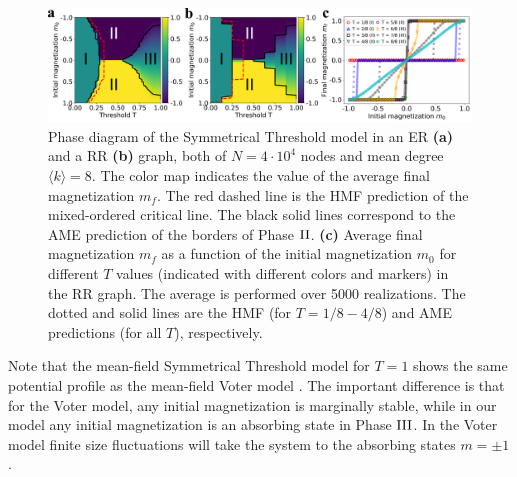 \begin{figure}
	\centering \captionsetup{font=sf}
	\includegraphics[width=\linewidth]{Figs/Aging_STM/FIG2.pdf}
	\caption[Phase diagram in random networks]{\label{ER_REG_PD} Phase diagram of the Symmetrical Threshold model in an ER \textbf{(a)} and a RR \textbf{(b)} graph, both of $N=4\cdot10^4$ nodes and mean degree $\langle k \rangle=8$. The color map indicates the value of the average final magnetization $m_f$. The red dashed line is the HMF prediction of the mixed-ordered critical line. The black solid lines correspond to the AME prediction of the borders of Phase ${\rm II}$. \textbf{(c)} Average final magnetization $m_f$ as a function of the initial magnetization $m_0$ for different $T$ values (indicated with different colors and markers) in the RR graph. The average is performed over 5000 realizations. The dotted and solid lines are the HMF (for $T=1/8 - 4/8$) and AME predictions (for all $T$), respectively.}
\end{figure}


Note that the mean-field Symmetrical Threshold model for $T=1$ shows the same potential profile as the mean-field Voter model \cite{Suchecki-2005, Voter-original,castellano2009statistical}. The important difference is that for the Voter model, any initial magnetization is marginally stable, while in our model any initial magnetization is an absorbing state in Phase ${\rm III}$. In the Voter model finite size fluctuations will take the system to the absorbing states $m=\pm 1$. 


